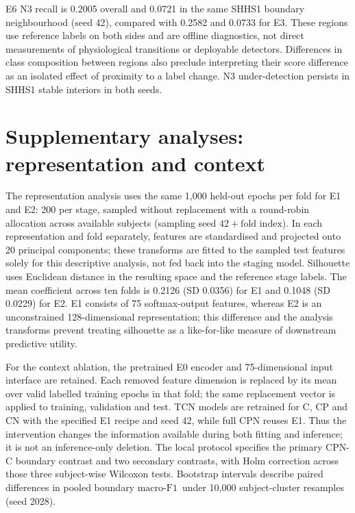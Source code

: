 \documentclass[10pt,a4paper]{article}
\newcommand{\mf}{\ensuremath{\mathrm{macro\text{-}F1}}}
\begin{document}
E6 N3 recall is 0.2005 overall and 0.0721 in the same SHHS1 boundary neighbourhood (seed 42), compared with
0.2582 and 0.0733 for E3. These regions use reference labels on both sides and are offline diagnostics,
not direct measurements of physiological transitions or deployable detectors. Differences in class
composition between regions also preclude interpreting their score difference as an isolated effect
of proximity to a label change. N3 under-detection persists in SHHS1 stable interiors in both seeds.

\section*{Supplementary analyses: representation and context}

The representation analysis uses the same 1,000 held-out epochs per fold for E1 and E2: 200 per
stage, sampled without replacement with a round-robin allocation across available subjects
(sampling seed $42+\text{fold index}$). In each representation and fold separately, features are
standardised and projected onto 20 principal components; these transforms are fitted to the
sampled test features solely for this descriptive analysis, not fed back into the staging model.
Silhouette uses Euclidean distance in the resulting space and the reference stage labels. The
mean coefficient across ten folds is 0.2126 (SD 0.0356) for E1 and 0.1048 (SD 0.0229) for E2.
E1 consists of 75 softmax-output features, whereas E2 is an unconstrained 128-dimensional
representation; this difference and the analysis transforms prevent treating silhouette as a
like-for-like measure of downstream predictive utility.

For the context ablation, the pretrained E0 encoder and 75-dimensional input interface are
retained. Each removed feature dimension is replaced by its mean over valid labelled training
epochs in that fold; the same replacement vector is applied to training, validation and test.
TCN models are retrained for C, CP and CN with the specified E1 recipe and seed 42, while full
CPN reuses E1. Thus the intervention changes the information available during both fitting and
inference; it is not an inference-only deletion. The local protocol specifies the primary CPN-C
boundary contrast and two secondary contrasts, with Holm correction across those three
subject-wise Wilcoxon tests. Bootstrap intervals describe paired differences in pooled boundary
\mf\ under 10,000 subject-cluster resamples (seed 2028).
\end{document}
